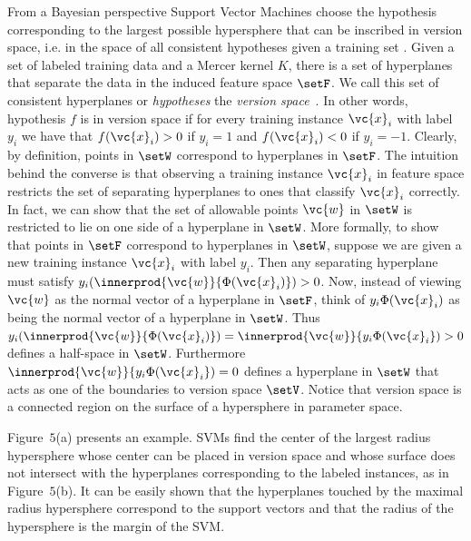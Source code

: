 From a Bayesian perspective Support Vector Machines choose the 
hypothesis corresponding to the largest possible hypersphere 
that can be inscribed in version space, i.e. in the 
space of all consistent hypotheses given a training set \cite{SVM01}.
Given a set of labeled training data and a Mercer kernel $K$, there is
a set of hyperplanes that separate the data in the induced feature
space $\setF$. We call this set of consistent hyperplanes or {\em
hypotheses} the {\em version space}~\cite{Mitchell:AI82}. In other
words, hypothesis $f$ is in version space if for every training
instance $\vc{x}_i$ with label $y_i$ we have that $f(\vc{x}_i) > 0$ if
$y_i = 1$ and $f(\vc{x}_i) < 0$ if $y_i = -1$.
Clearly, by definition, points in $\setW$ correspond to hyperplanes in
$\setF$. The intuition behind the converse is that observing a
training instance $\vc{x}_i$ in feature space restricts the set of
separating hyperplanes to ones that classify $\vc{x}_i$ correctly. In
fact, we can show that the set of allowable points $\vc{w}$ in $\setW$
is restricted to lie on one side of a hyperplane in $\setW$.  More
formally, to show that points in $\setF$ correspond to hyperplanes in
$\setW$, suppose we are given a new training instance $\vc{x}_i$ with
label $y_i$. Then any separating hyperplane must satisfy
$y_i(\innerprod{\vc{w}}{\Phi(\vc{x}_i)}) > 0$. Now, instead of viewing
$\vc{w}$ as the normal vector of a hyperplane in $\setF$, think of
$y_i \Phi(\vc{x}_i)$ as being the normal vector of a hyperplane in
$\setW$. Thus $y_i(\innerprod{\vc{w}}{\Phi(\vc{x}_i)}) =
\innerprod{\vc{w}}{y_i \Phi(\vc{x}_i}) > 0$ defines a half-space in
$\setW$.  Furthermore $\innerprod{\vc{w}}{y_i \Phi(\vc{x}_i}) = 0$
defines a hyperplane in $\setW$ that acts as one of the boundaries to
version space $\setV$. Notice that version space is a connected region
on the surface of a hypersphere in parameter space. 

Figure~$5$(a) presents an example.
SVMs find the center of the largest radius hypersphere whose center
can be placed in version space and whose surface does not intersect
with the hyperplanes corresponding to the labeled instances, as in
Figure~$5$(b). It can be easily shown that the
hyperplanes touched by the maximal radius hypersphere
correspond to the support vectors and that the radius of the
hypersphere is the margin of the SVM.

